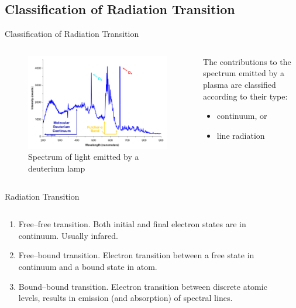 \documentclass[final]{beamer}
\begin{document}
\subsection{Classification of Radiation Transition}
\begin{frame}{Classification of Radiation Transition}
  \begin{columns}%
  \begin{column}{0.6\textwidth}
  \begin{figure}
    \includegraphics[width=\textwidth]{figures/Deuterium_lamp_1.png} 
    \caption{Spectrum of light emitted by a deuterium lamp}
  \end{figure}
  \end{column}  
  \begin{column}{0.4\textwidth}
  The contributions to the spectrum emitted by a plasma are classified according to their type:
  \begin{itemize}
    \item continuum, or
    \item line radiation
  \end{itemize}
  \end{column}
  \end{columns}
\end{frame}
\begin{frame}{Radiation Transition}
  \begin{columns}%
  \begin{column}{0.6\textwidth}
  \begin{enumerate}
    \item Free--free transition. Both initial and final electron states are in continuum. Usually infared.
    \item Free--bound transition. Electron transition between a free state in continuum and a bound state in atom.
    \item Bound--bound transition. Electron transition between discrete atomic levels, results in emission (and absorption) of spectral lines.
  \end{enumerate}
  \end{column}
  \begin{column}{0.4\textwidth}

  \end{column}
  \end{columns}
\end{frame}
\end{document}
